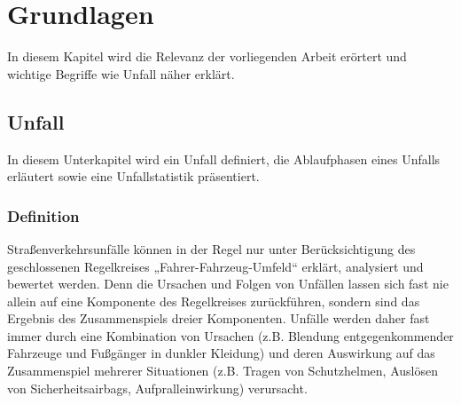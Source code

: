 \chapter{Grundlagen}
In diesem Kapitel wird die Relevanz der vorliegenden Arbeit erörtert und wichtige Begriffe wie \glqq Unfall\grqq{} näher erklärt.

%
%
\section{Unfall}
In diesem Unterkapitel wird ein Unfall definiert, die Ablaufphasen eines Unfalls er\-läut\-ert sowie eine Unfallstatistik präsentiert.
%
%
%
%
\subsection{Definition}
Straßenverkehrsunfälle können in der Regel nur unter Berücksichtigung des geschlossenen Regelkreises „Fahrer-Fahrzeug-Umfeld“ erklärt, analysiert und bewertet werden. Denn die Ursachen und Folgen von Unfällen lassen sich fast nie allein auf eine Komponente des Regelkreises zurückführen, sondern sind das Ergebnis des Zusammenspiels dreier Komponenten. Unfälle werden daher fast immer durch eine Kombination von Ursachen (z.B. Blendung entgegenkommender Fahrzeuge und Fußgänger in dunkler Kleidung) und deren Auswirkung auf das Zusammenspiel mehrerer Situationen (z.B. Tragen von Schutzhelmen, Auslösen von Sicherheitsairbags, Aufpralleinwirkung) verursacht. \citep{Appel2002}

